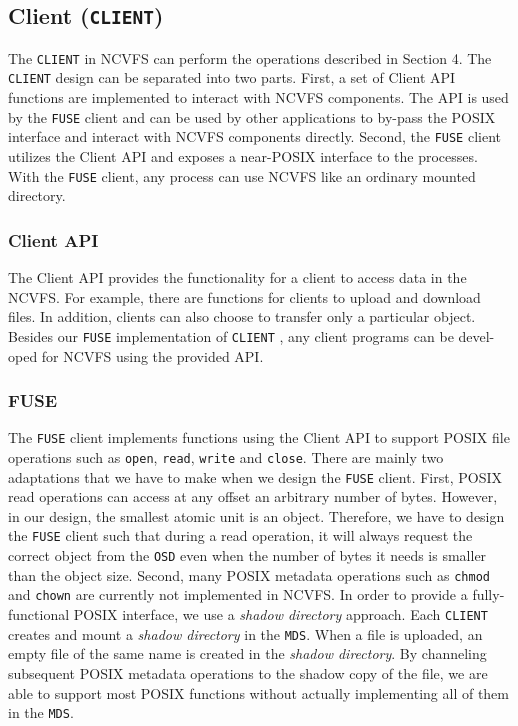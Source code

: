 \documentclass{article}
\def\osd{\texttt{OSD} }
\def\fuse{\texttt{FUSE} }
\def\client{\texttt{CLIENT} }
\begin{document}
\subsection{Client (\texttt{CLIENT})}
The \client in NCVFS can perform the operations described in Section 4. The
\client design can be separated into two parts. First, a set of Client API
functions are implemented to interact with NCVFS components. The API is
used by the \fuse client and can be used by other applications to by-pass the
POSIX interface and interact with NCVFS components directly. Second, the
\fuse client utilizes the Client API and exposes a near-POSIX interface to the
processes. With the \fuse client, any process can use NCVFS like an ordinary
mounted directory.

\subsubsection{Client API}
The Client API provides the functionality for a client to access data in the
NCVFS. For example, there are functions for clients to upload and download
files. In addition, clients can also choose to transfer only a particular
object.
Besides our \fuse implementation of \client , any client programs can be devel-
oped for NCVFS using the provided API.

\subsubsection{FUSE}
The \fuse client implements functions using the Client API to support POSIX
file operations such as \texttt{open}, \texttt{read}, \texttt{write} and \texttt{close}.
There are mainly two
adaptations that we have to make when we design the \fuse client. First, POSIX
read operations can access at any offset an arbitrary number of bytes. However,
in our design, the smallest atomic unit is an object. Therefore, we have to
design the \fuse client such that during a read operation, it will always request
the correct object from the \osd even when the number of bytes it needs is
smaller
than the object size. Second, many POSIX metadata operations such as \texttt{chmod}
and \texttt{chown} are currently not implemented in NCVFS. In order to provide a fully-
functional POSIX interface, we use a \textit{shadow directory} approach. Each \client
creates and mount a \textit{shadow directory} in the \texttt{MDS}. When a file is uploaded, an
empty file of the same name is created in the \textit{shadow directory}. By channeling
subsequent POSIX metadata operations to the shadow copy of the file, we are
able to support most POSIX functions without actually implementing all of
them in the \texttt{MDS}.
\end{document}
